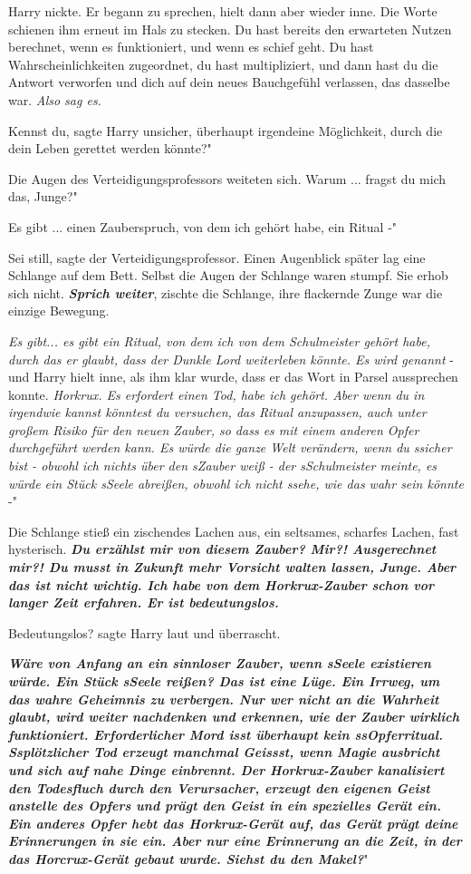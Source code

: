 Harry nickte. Er begann zu sprechen, hielt dann aber wieder inne. Die Worte
schienen ihm erneut im Hals zu stecken. Du hast bereits den erwarteten Nutzen
berechnet, wenn es funktioniert, und wenn es schief geht. Du hast
Wahrscheinlichkeiten zugeordnet, du hast multipliziert, und dann hast du die
Antwort verworfen und dich auf dein neues Bauchgefühl verlassen, das dasselbe
war.
\emph{Also sag es.}

\glqq Kennst du\grqq{}, sagte Harry unsicher, \glqq überhaupt irgendeine
Möglichkeit, durch die dein Leben gerettet werden könnte?"

Die Augen des Verteidigungsprofessors weiteten sich. \glqq Warum ... fragst du
mich das, Junge?"

\glqq Es gibt ... einen Zauberspruch, von dem ich gehört habe, ein Ritual -"

\glqq Sei still\grqq{}, sagte der Verteidigungsprofessor. Einen Augenblick
später lag eine Schlange auf dem Bett. Selbst die Augen der Schlange waren
stumpf. Sie erhob sich nicht. \glqq \textbf{\emph{Sprich weiter}}\grqq{},
zischte die Schlange, ihre flackernde Zunge war die einzige Bewegung.

\glqq \emph{Es gibt... es gibt ein Ritual, von dem ich von dem Schulmeister
gehört habe, durch das er glaubt, dass der Dunkle Lord weiterleben könnte. Es
wird genannt} -\grqq{} und Harry hielt inne, als ihm klar wurde, dass er das
Wort in Parsel aussprechen konnte. \glqq \emph{Horkrux. Es erfordert einen Tod,
habe ich gehört. Aber wenn du in irgendwie kannst könntest du versuchen, das
Ritual anzupassen, auch unter großem Risiko für den neuen Zauber, so dass es mit
einem anderen Opfer durchgeführt werden kann. Es würde die ganze Welt verändern,
wenn du ssicher bist - obwohl ich nichts über den sZauber weiß - der
sSchulmeister meinte, es würde ein Stück sSeele abreißen, obwohl ich nicht
ssehe, wie das wahr sein könnte }-"

Die Schlange stieß ein zischendes Lachen aus, ein seltsames, scharfes Lachen,
fast hysterisch. \glqq \textbf{\emph{Du erzählst mir von diesem Zauber? Mir?!
Ausgerechnet mir?! Du musst in Zukunft mehr Vorsicht walten lassen, Junge. Aber
das ist nicht wichtig. Ich habe von dem Horkrux-Zauber schon vor langer Zeit
erfahren. Er ist bedeutungslos.\grqq{} }}

\glqq Bedeutungslos?\grqq{} sagte Harry laut und überrascht.

\glqq \textbf{\emph{Wäre von Anfang an ein sinnloser Zauber, wenn sSeele
existieren würde. Ein Stück sSeele reißen? Das ist eine Lüge. Ein Irrweg, um das
wahre Geheimnis zu verbergen. Nur wer nicht an die Wahrheit glaubt, wird weiter
nachdenken und erkennen, wie der Zauber wirklich funktioniert. Erforderlicher
Mord isst überhaupt kein ssOpferritual. Ssplötzlicher Tod erzeugt manchmal
Geissst, wenn Magie ausbricht und sich auf nahe Dinge einbrennt. Der
Horkrux-Zauber kanalisiert den Todesfluch durch den Verursacher, erzeugt den
eigenen Geist anstelle des Opfers und prägt den Geist in ein spezielles Gerät
ein. Ein anderes Opfer hebt das Horkrux-Gerät auf, das Gerät prägt deine
Erinnerungen in sie ein. Aber nur eine Erinnerung an die Zeit, in der das
Horcrux-Gerät gebaut wurde. Siehst du den Makel?}}"

